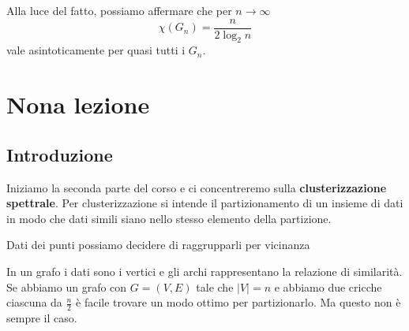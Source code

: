 \documentclass[12pt]{report}
\begin{document}
\noindent 
Alla luce del fatto, possiamo affermare  che per $n \rightarrow \infty$  
$$\chi(G_n) =  \frac{n}{2\log_2{n}}$$
vale asintoticamente per quasi tutti i $G_n$. 


\chapter{Nona lezione}


\section{Introduzione}

\noindent 
Iniziamo la seconda parte del corso e ci concentreremo sulla \textbf{clusterizzazione spettrale}. Per clusterizzazione si intende il partizionamento di un insieme di dati in modo che dati simili siano nello stesso elemento della partizione.

\begin{exmp}
    Dati dei punti possiamo decidere di raggrupparli per vicinanza
\end{exmp}

\noindent
In un grafo i dati sono i vertici e gli archi rappresentano la relazione di similarità. Se abbiamo un grafo con $G = (V,E)$ tale che $|V| = n$ e abbiamo due cricche ciascuna da $\frac{n}{2}$ è facile trovare un modo ottimo per partizionarlo. Ma questo non è sempre il caso.
\end{document}
